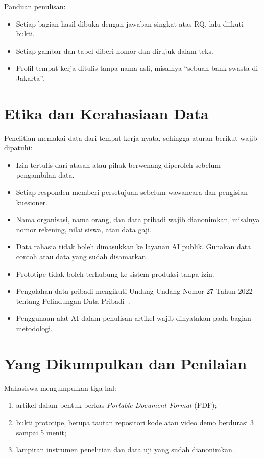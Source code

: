 \documentclass[11pt, a4paper]{article}
\newcommand{\eng}[1]{\textit{#1}}
\begin{document}
Panduan penulisan:
\begin{itemize}
  \item Setiap bagian hasil dibuka dengan jawaban singkat atas RQ, lalu diikuti bukti.
  \item Setiap gambar dan tabel diberi nomor dan dirujuk dalam teks.
  \item Profil tempat kerja ditulis tanpa nama asli, misalnya ``sebuah bank swasta di Jakarta''.
\end{itemize}

\section{Etika dan Kerahasiaan Data}

Penelitian memakai data dari tempat kerja nyata, sehingga aturan berikut wajib dipatuhi:
\begin{itemize}
  \item Izin tertulis dari atasan atau pihak berwenang diperoleh sebelum pengambilan data.
  \item Setiap responden memberi persetujuan sebelum wawancara dan pengisian kuesioner.
  \item Nama organisasi, nama orang, dan data pribadi wajib dianonimkan, misalnya nomor rekening, nilai siswa, atau data gaji.
  \item Data rahasia tidak boleh dimasukkan ke layanan AI publik. Gunakan data contoh atau data yang sudah disamarkan.
  \item Prototipe tidak boleh terhubung ke sistem produksi tanpa izin.
  \item Pengolahan data pribadi mengikuti Undang-Undang Nomor 27 Tahun 2022 tentang Pelindungan Data Pribadi~\cite{uupdp2022}.
  \item Penggunaan alat AI dalam penulisan artikel wajib dinyatakan pada bagian metodologi.
\end{itemize}

\section{Yang Dikumpulkan dan Penilaian}

Mahasiswa mengumpulkan tiga hal:
\begin{enumerate}
  \item artikel dalam bentuk berkas \eng{Portable Document Format} (PDF);
  \item bukti prototipe, berupa tautan repositori kode atau video demo berdurasi 3 sampai 5 menit;
  \item lampiran instrumen penelitian dan data uji yang sudah dianonimkan.
\end{enumerate}
\end{document}
